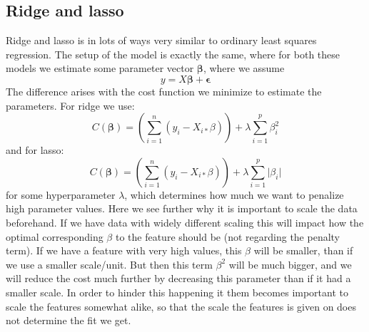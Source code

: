 \documentclass{article}
\begin{document}
\subsection{Ridge and lasso}
Ridge and lasso is in lots of ways very similar to ordinary least squares
regression. The setup of the model is exactly the same, where for both these
models we estimate some parameter vector $\mathbf{\beta}$, where we assume
$$y = X \mathbf{\beta} + \mathbf{\epsilon}$$
The difference arises with the cost function we minimize to estimate the parameters. For ridge we use:
$$C(\mathbf{\beta}) = \left(\sum_{i=1}^{n} (y_i - X_{i *} \beta)\right) + \lambda \sum_{i=1}^p \beta_i^2$$
and for lasso:
$$C(\mathbf{\beta}) = \left(\sum_{i=1}^{n} (y_i - X_{i *} \beta)\right) + \lambda \sum_{i=1}^p \lvert \beta_i \rvert$$
for some hyperparameter $\lambda$, which determines how much we want to
penalize high parameter values. Here we see further why it is important to scale
the data beforehand. If we have data with widely different scaling this will
impact how the optimal corresponding $\beta$ to the feature should be (not
regarding the penalty term). If we have a feature with very high values, this
$\beta$ will be smaller, than if we use a smaller scale/unit. But then this term
$\beta^2$ will be much bigger, and we will reduce the cost much further by
decreasing this parameter than if it had a smaller scale. In order to hinder
this happening it them becomes important to scale the features somewhat alike,
so that the scale the features is given on does not determine the fit we get.
\end{document}
